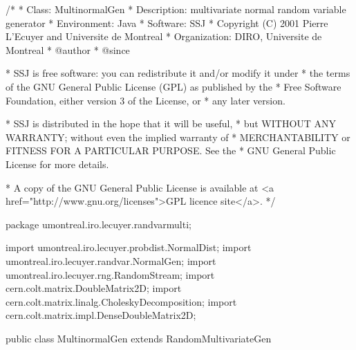 \begin{code}
\begin{hide}
/*
 * Class:        MultinormalGen
 * Description:  multivariate normal random variable generator
 * Environment:  Java
 * Software:     SSJ
 * Copyright (C) 2001  Pierre L'Ecuyer and Universite de Montreal
 * Organization: DIRO, Universite de Montreal
 * @author
 * @since

 * SSJ is free software: you can redistribute it and/or modify it under
 * the terms of the GNU General Public License (GPL) as published by the
 * Free Software Foundation, either version 3 of the License, or
 * any later version.

 * SSJ is distributed in the hope that it will be useful,
 * but WITHOUT ANY WARRANTY; without even the implied warranty of
 * MERCHANTABILITY or FITNESS FOR A PARTICULAR PURPOSE.  See the
 * GNU General Public License for more details.

 * A copy of the GNU General Public License is available at
   <a href="http://www.gnu.org/licenses">GPL licence site</a>.
 */
\end{hide}
package umontreal.iro.lecuyer.randvarmulti;
\begin{hide}
import umontreal.iro.lecuyer.probdist.NormalDist;
import umontreal.iro.lecuyer.randvar.NormalGen;
import umontreal.iro.lecuyer.rng.RandomStream;
import cern.colt.matrix.DoubleMatrix2D;
import cern.colt.matrix.linalg.CholeskyDecomposition;
import cern.colt.matrix.impl.DenseDoubleMatrix2D;
\end{hide}

public class MultinormalGen extends RandomMultivariateGen\begin{hide} {
   protected double[] mu;
   protected DoubleMatrix2D sigma;
   protected DoubleMatrix2D sqrtSigma;
   protected double[] temp;
   protected static final double MYINF = 37.54;


   private void initMN (NormalGen gen1, double[] mu, int d) {
      if (gen1 == null)
         throw new NullPointerException ("gen1 is null");

      if (gen1.getMu() != 0.0)
         throw new IllegalArgumentException ("mu != 0");
      if (gen1.getSigma() != 1.0)
         throw new IllegalArgumentException ("sigma != 1");
/*
      NormalDist dist = (NormalDist) gen1.getDistribution();
      if (dist != null) {
         if (dist.getMu() != 0.0)
            throw new IllegalArgumentException ("mu != 0");
         if (dist.getSigma() != 1.0)
            throw new IllegalArgumentException ("sigma != 1");
      }
      dist = null;
*/
      this.gen1 = gen1;

      if (mu == null) {    // d is the dimension
         dimension = d;
         this.mu = new double[d];
      } else {      // d is unused
         dimension = mu.length;
         this.mu = (double[])mu.clone();
      }
      temp = new double[dimension];
     }\end{hide}\end{code}


